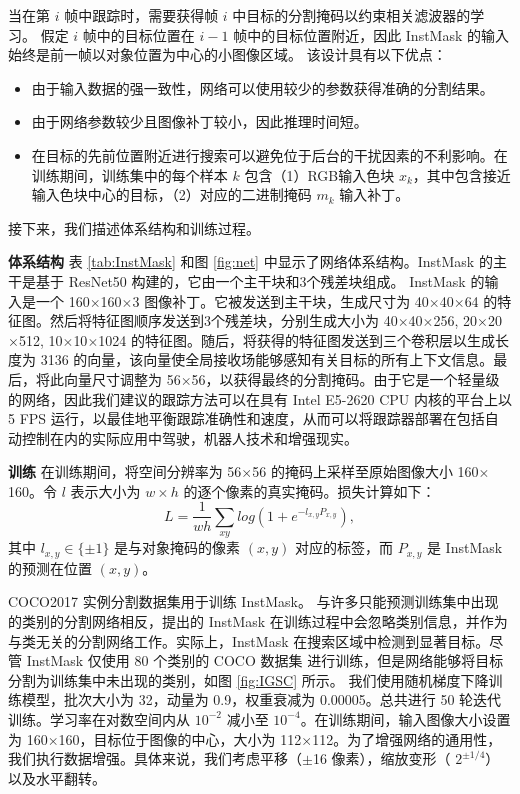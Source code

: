 当在第 $i$ 帧中跟踪时，需要获得帧 $i$ 中目标的分割掩码以约束相关滤波器的学习。
假定 $i$ 帧中的目标位置在 $i-1$ 帧中的目标位置附近，因此 InstMask 的输入始终是前一帧以对象位置为中心的小图像区域。
该设计具有以下优点：

\begin{itemize}
\item 由于输入数据的强一致性，网络可以使用较少的参数获得准确的分割结果。
\item 由于网络参数较少且图像补丁较小，因此推理时间短。
\item 在目标的先前位置附近进行搜索可以避免位于后台的干扰因素的不利影响。在训练期间，训练集中的每个样本 $k$ 包含（1）RGB输入色块 $x_k$，其中包含接近输入色块中心的目标，（2）对应的二进制掩码 $m_{k}$ 输入补丁。
\end{itemize}

接下来，我们描述体系结构和训练过程。

\textbf{体系结构} 表 \ref{tab:InstMask} 和图 \ref{fig:net} 中显示了网络体系结构。InstMask 的主干是基于 ResNet50 \cite{He2016DeepRL} 构建的，它由一个主干块和3个残差块组成。
InstMask 的输入是一个 160$\times$160$\times$3 图像补丁。它被发送到主干块，生成尺寸为 40$\times$40$\times$64 的特征图。然后将特征图顺序发送到3个残差块，分别生成大小为 40$\times$40$\times$256, 20$\times$20$\times$512, 10$\times$10$\times$1024 的特征图。随后，将获得的特征图发送到三个卷积层以生成长度为 3136 的向量，该向量使全局接收场能够感知有关目标的所有上下文信息。最后，将此向量尺寸调整为 56$\times$56，以获得最终的分割掩码。由于它是一个轻量级的网络，因此我们建议的跟踪方法可以在具有 Intel E5-2620 CPU 内核的平台上以 5 FPS 运行，以最佳地平衡跟踪准确性和速度，从而可以将跟踪器部署在包括自动控制在内的实际应用中驾驶，机器人技术和增强现实。

\textbf{训练} 在训练期间，将空间分辨率为 56$\times$56 的掩码上采样至原始图像大小 160$\times$160。令 $l$ 表示大小为 $w \times h$ 的逐个像素的真实掩码。损失计算如下：
\begin{equation}
L = \frac{1}{wh} \sum_{xy}{log(1+e^{-l_{x,y}P_{x,y}})},
\end{equation}
其中 $l_{x,y} \in \{ \pm 1 \}$ 是与对象掩码的像素 $(x,y)$ 对应的标签，而 $P_{x,y}$ 是 InstMask 的预测在位置 $(x,y)$。

COCO2017 \cite{COCO} 实例分割数据集用于训练 InstMask。
与许多只能预测训练集中出现的类别的分割网络相反，提出的 InstMask 在训练过程中会忽略类别信息，并作为与类无关的分割网络工作。实际上，InstMask 在搜索区域中检测到显著目标。尽管 InstMask 仅使用 80 个类别的 COCO 数据集 \cite{COCO} 进行训练，但是网络能够将目标分割为训练集中未出现的类别，如图 \ref{fig:IGSC} 所示。
我们使用随机梯度下降训练模型，批次大小为 32，动量为 0.9，权重衰减为 0.00005。总共进行 50 轮迭代训练。学习率在对数空间内从 $10^{-2}$ 减小至 $10^{-4}$。在训练期间，输入图像大小设置为 160$\times$160，目标位于图像的中心，大小为 112$\times$112。为了增强网络的通用性，我们执行数据增强。具体来说，我们考虑平移（$\pm$16 像素），缩放变形（ $2^{\pm 1/4}$）以及水平翻转。

